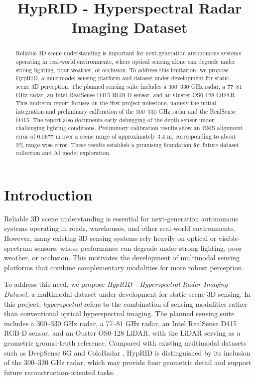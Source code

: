 \documentclass[conference]{IEEEtran}
\title{HypRID - Hyperspectral Radar Imaging Dataset}
\author{
    \IEEEauthorblockN{Steven Chen}
    \IEEEauthorblockA{
        Electrical and Computer Engineering \\
        Rice University \\
        sc311@rice.edu
    }
    \and
    \IEEEauthorblockN{Yung-Hsin Tsai}
    \IEEEauthorblockA{
        Electrical and Computer Engineering\\
        Rice University \\
        yt66@rice.edu
    }
}
\begin{document}
\maketitle

\begin{abstract}
Reliable 3D scene understanding is important for next-generation autonomous systems operating in real-world environments, where optical sensing alone can degrade under strong lighting, poor weather, or occlusion. To address this limitation, we propose HypRID, a multimodel sensing platform and dataset under development for static-scene 3D perception. The planned sensing suite includes a 300--330 GHz radar, a 77--81 GHz radar, an Intel RealSense D415 RGB-D sensor, and an Ouster OS0-128 LiDAR. This midterm report focuses on the first project milestone, namely the initial integration and preliminary calibration of the 300--330 GHz radar and the RealSense D415. The report also documents early debugging of the depth sensor under challenging lighting conditions. Preliminary calibration results show an RMS alignment error of 0.0677 m over a scene range of approximately 3.4 m, corresponding to about 2\% range-wise error. These results establish a promising foundation for future dataset collection and AI model exploration.
\end{abstract}

\section{Introduction}

Reliable 3D scene understanding is essential for next-generation autonomous systems operating in roads, warehouses, and other real-world environments. However, many existing 3D sensing systems rely heavily on optical or visible-spectrum sensors, whose performance can degrade under strong lighting, poor weather, or occlusion\cite{guan2020through,prabhakara2022exploring}. This motivates the development of multimodal sensing platforms that combine complementary modalities for more robust perception.

To address this need, we propose \textit{HypRID - Hyperspectral Radar Imaging Dataset}, a multimodal dataset under development for static-scene 3D sensing. In this project, \textit{hyperspectral} refers to the combination of sensing modalities rather than conventional optical hyperspectral imaging. The planned sensing suite includes a 300--330 GHz radar, a 77--81 GHz radar, an Intel RealSense D415 RGB-D sensor, and an Ouster OS0-128 LiDAR, with the LiDAR serving as a geometric ground-truth reference. Compared with existing multimodal datasets such as DeepSense 6G \cite{alkhateeb2023deepsense} and ColoRadar \cite{kramer2022coloradar}, HypRID is distinguished by its inclusion of the 300--330 GHz radar, which may provide finer geometric detail and support future reconstruction-oriented tasks.
\end{document}
